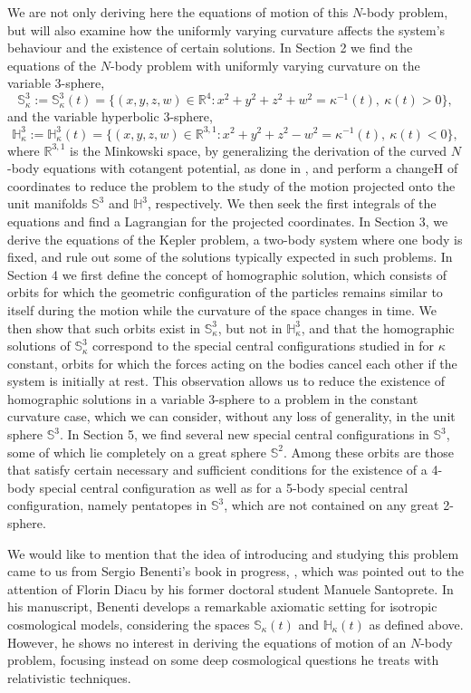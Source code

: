 \documentclass[12pt]{amsart}
\theoremstyle{definition}
\def \mb{\mathbb}
\def \R{\mb R}                 %
\def \S{\mb S}        %
\def \H{\mb H}        %
\begin{document}
{We are not only deriving here the equations of motion of this $N$-body problem, but will also examine how the uniformly varying curvature affects the system's behaviour and the existence of certain solutions. In Section 2 we find the equations of the $N$-body problem with uniformly varying curvature on the variable 3-sphere, 
$$
\S^3_\kappa:=\S^3_\kappa(t)=\{(x,y,z,w) \in \R^4:x^2+y^2+z^2+w^2=\kappa^{-1}(t),\ \kappa(t)>0\},
$$ 
and the variable hyperbolic 3-sphere, 
$$
\H^3_\kappa:=\H^3_\kappa(t)=\{(x,y,z,w) \in \R^{3,1}: x^2+y^2+z^2-w^2=\kappa^{-1}(t),\ \kappa(t)<0\},
$$ 
where $\R^{3,1}$ is the Minkowski space, by generalizing the derivation of the curved $N$-body equations with cotangent potential, as done in \cite{Diacu}, and perform a changeH of coordinates to reduce the problem to the study of the motion projected onto the unit manifolds $\S^3$ and $\H^3$, respectively. We then seek the first integrals of the equations and find a Lagrangian for the projected coordinates.  In Section 3, we derive the equations of the Kepler problem, a two-body system where one body is fixed, and rule out some of the solutions typically expected in such problems. In Section 4 we first define the concept of homographic solution, which consists of orbits for which the geometric configuration of the particles remains similar to itself during the motion while the curvature of the space changes in time. We then show that such orbits exist in $\S^3_\kappa$, but not in $\H^3_\kappa$, and that the homographic solutions of $\S^3_\kappa$ correspond to the special central configurations studied in \cite{DiacuZhu} for $\kappa$ constant, orbits for which the forces acting on the bodies cancel each other if the system is initially at rest. This observation allows us to reduce the existence of homographic solutions in a variable 3-sphere to a problem in the constant curvature case, which we can consider, without any loss of generality, in the unit sphere $\S^3$. In Section 5, we find several new special central configurations in $\S^3$, some of which lie completely on a great sphere $\S^2$. Among these orbits are those that satisfy certain necessary and sufficient conditions for the existence of a 4-body special central configuration as well as for a 5-body special central configuration, namely pentatopes in $\S^3$, which are not contained on any great 2-sphere.

We would like to mention that the idea of introducing and studying this problem came to us from Sergio Benenti's book in progress, \cite{Ben}, which was pointed out to the attention of Florin Diacu by his former doctoral student Manuele Santoprete. In his manuscript, Benenti develops a remarkable axiomatic setting for isotropic cosmological models, considering the spaces $\S_\kappa(t)$ and $\H_\kappa(t)$ as defined above. However, he shows no interest in deriving the equations of motion of an $N$-body problem, focusing instead on some deep cosmological questions he treats with relativistic techniques.   

}
\end{document}
